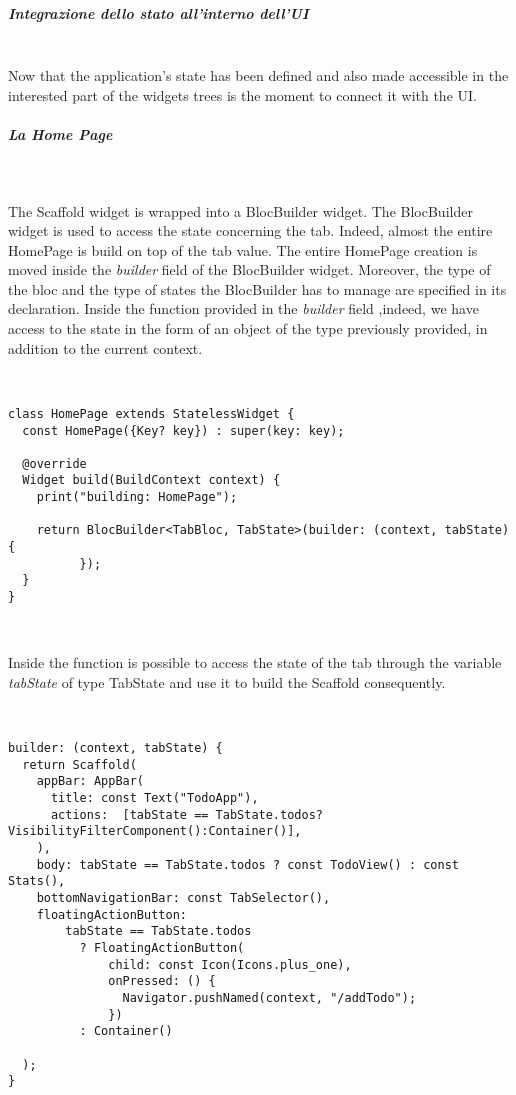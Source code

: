 \subparagraph{Integrazione dello stato all’interno dell’UI}\mbox{}\\

\label{subpar:todo_app_bloc_core_state}
Now that the application's state has been defined and also made accessible in the interested part of the widgets trees is the moment to connect it with the UI.

\subparagraph{La Home Page}\mbox{}\\
\label{subpar:todo_app_bloc_core_state}

The Scaffold widget is wrapped into a BlocBuilder widget. The BlocBuilder widget is used to access the state concerning the tab. Indeed, almost the entire HomePage is build on top of the tab value. The entire HomePage creation is moved inside the \textit{builder} field of the BlocBuilder widget. Moreover, the type of the bloc and the type of states the BlocBuilder has to manage are specified in its declaration. Inside the function provided in the \textit{builder} field ,indeed, we have access to the state in the form of an object of the type previously provided, in addition to the current context.
\begin{code}
\mbox{}\\
 \mbox{}
\label{code:2.14}
\begin{verbatim}
class HomePage extends StatelessWidget {
  const HomePage({Key? key}) : super(key: key);

  @override
  Widget build(BuildContext context) {
    print("building: HomePage");

    return BlocBuilder<TabBloc, TabState>(builder: (context, tabState) {
          });
  }
}
\end{verbatim}
\mbox{}\
\end{code}
Inside the function is possible to access the state of the tab through the variable \textit{tabState} of type TabState and use it to build the Scaffold consequently.
\begin{code}
\mbox{}\\
 \mbox{}
\label{code:2.14}
\begin{verbatim}
builder: (context, tabState) {
  return Scaffold(
    appBar: AppBar(
      title: const Text("TodoApp"),
      actions:  [tabState == TabState.todos?   VisibilityFilterComponent():Container()],
    ),
    body: tabState == TabState.todos ? const TodoView() : const Stats(),
    bottomNavigationBar: const TabSelector(),
    floatingActionButton:
        tabState == TabState.todos
          ? FloatingActionButton(
              child: const Icon(Icons.plus_one),
              onPressed: () {
                Navigator.pushNamed(context, "/addTodo");
              })
          : Container()

  );
}
\end{verbatim}
\mbox{}
\end{code}

